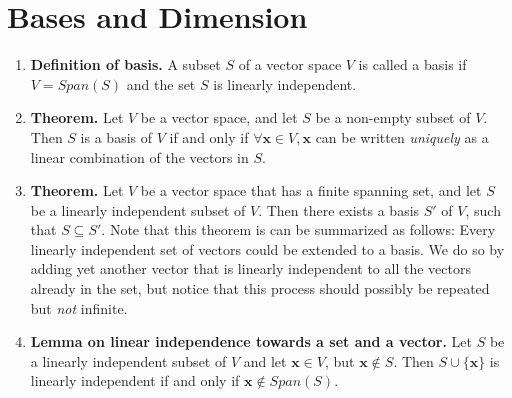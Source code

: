 \documentclass[oneside, 12pt]{book}
\newcommand{\settag}[1]{\renewcommand{\theenumi}{#1}}
\newcommand{\tbf}[1]{\textbf{#1}}
\newcommand{\tit}[1]{\textit{#1}}
\begin{document}
\section{Bases and Dimension}
    \begin{enumerate}
        \settag{1.6.1}
        \item \tbf{Definition of basis.} A subset $S$ of a vector space $V$ is called a basis if $V=Span(S)$ and
         the set $S$ is linearly independent.
        
        \settag{1.6.3}
        \item \tbf{Theorem. }Let $V$ be a vector space, and let $S$ be a non-empty subset of $V$. Then $S$ is a
         basis of $V$ if and only if $\forall \mathbf{x} \in V, \mathbf{x}$ can be written \tit{uniquely} as a 
         linear combination of the vectors in $S$.
        
        \settag{1.6.6}
        \item \tbf{Theorem. }Let $V$ be a vector space that has a finite spanning set, and let $S$ be a linearly
         independent subset of $V$. Then there exists a basis $S'$ of $V$, such that $S\subseteq S'.$ Note that 
         this theorem is can be summarized as follows: Every linearly independent set of vectors could be extended
          to a basis. We do so by adding yet another vector that is linearly independent to all the vectors already
           in the set, but notice that this process should possibly be repeated but \tit{not} infinite.
        
        \settag{1.6.8}
        \item \tbf{Lemma on linear independence towards a set and a vector.} Let $S$ be a linearly independent subset
         of $V$ and let $\mathbf{x}\in V$, but $\mathbf{x} \notin S$. Then $S\cup \{\mathbf{x} \}$ is linearly 
         independent if and only if $\mathbf{x} \notin Span(S)$.
        

\end{enumerate}
\end{document}
